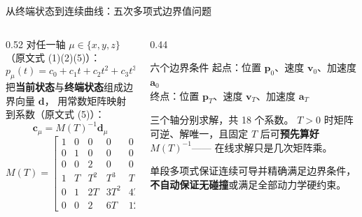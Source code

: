 \begin{frame}{从终端状态到连续曲线：五次多项式边界值问题}
  \small
  \begin{columns}[t]
    \begin{column}{0.52\textwidth}
      对任一轴 $\mu\in\{x,y,z\}$（原文式 (1)(2)(5)）：
      \[
        p_\mu(t)=c_0+c_1t+c_2t^2+c_3t^3+c_4t^4+c_5t^5
      \]
      把\textbf{当前状态}与\textbf{终端状态}组成边界向量 $\mathbf d$，
      用常数矩阵映射到系数（原文式 (5)）：
      \[
        \mathbf c_\mu = M(T)^{-1}\mathbf d_\mu
      \]
      \[
        M(T)=
        \begin{bmatrix}
          1&0&0&0&0&0\\
          0&1&0&0&0&0\\
          0&0&2&0&0&0\\
          1&T&T^2&T^3&T^4&T^5\\
          0&1&2T&3T^2&4T^3&5T^4\\
          0&0&2&6T&12T^2&20T^3
        \end{bmatrix}
      \]
    \end{column}
    \begin{column}{0.44\textwidth}
      \begin{block}{六个边界条件}
        \footnotesize
        起点：位置 $\mathbf p_0$、速度 $\mathbf v_0$、加速度 $\mathbf a_0$\\
        终点：位置 $\mathbf p_T$、速度 $\mathbf v_T$、加速度 $\mathbf a_T$
      \end{block}
      \begin{reading}[三个轴各解一次]
        \small
        三个轴分别求解，共 18 个系数。
        $T>0$ 时矩阵可逆、解唯一，且固定 $T$ 后可\textbf{预先算好} $M(T)^{-1}$——
        在线求解只是几次矩阵乘。
      \end{reading}
      \begin{reading}[不提供什么保证]
        \scriptsize
        单段多项式保证连续可导并精确满足边界条件，
        \textbf{不自动保证无碰撞}或满足全部动力学硬约束。
      \end{reading}
    \end{column}
  \end{columns}
\end{frame}

